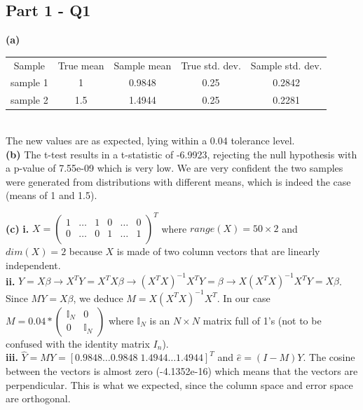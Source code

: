 \documentclass[11pt,a4paper,oneside]{report}
\begin{document}

\subsection*{Part 1 - Q1}
\noindent \large{\textbf{(a)}} \begin{tabular}{c | c | c | c | c}
Sample & True mean & Sample mean & True std. dev. & Sample std. dev.\\
sample 1 & 1 & 0.9848 & 0.25 & 0.2842\\
sample 2 & 1.5 & 1.4944 & 0.25 & 0.2281\\
\end{tabular}\\

The new values are as expected, lying within a 0.04 tolerance level.\\

\noindent \large{\textbf{(b)}} The t-test results in a t-statistic of -6.9923, rejecting the null hypothesis with a p-value of 7.55e-09 which is very low. We are very confident the two samples were generated from distributions with different means, which is indeed the case (means of 1 and 1.5).

\noindent \large{\textbf{(c)}} \textbf{i.} $X = \begin{pmatrix}
1 & \dots & 1 & 0 & \dots & 0\\
0 & \dots & 0 & 1 & \dots & 1\\

\end{pmatrix}^T$ where $range(X) = 50 \times 2$ and $dim(X) = 2$ because $X$ is made of two column vectors that are linearly independent.\\


\textbf{ii.} $Y = X\beta \to X^TY = X^TX\beta \to (X^TX)^{-1}X^TY = \beta \to X(X^TX)^{-1}X^TY = X\beta$. Since $MY = X\beta$, we deduce $M = X(X^TX)^{-1}X^T$. In our case $M = 
0.04 * \begin{pmatrix}
\mathbb{I}_N & 0\\
0 & \mathbb{I}_N
\end{pmatrix}
$
where $\mathbb{I}_N$ is an $N \times N$ matrix full of 1's (not to be confused with the identity matrix $I_n$).\\
                          
\textbf{iii.} $\hat{Y} = MY = [ 0.9848 \dots 0.9848 \; 1.4944 \dots 1.4944]^T$ and $\hat{e} = (I-M)Y$. The cosine between the vectors is almost zero (-4.1352e-16) which means that the vectors are perpendicular. This is what we expected, since the column space and error space are orthogonal.\\
\end{document}
